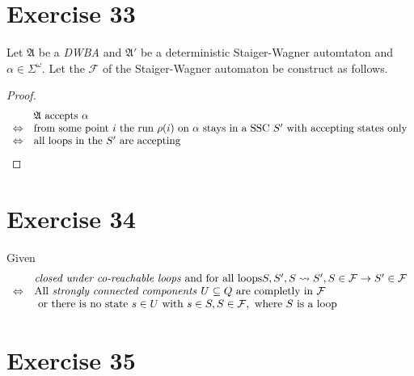 \documentclass[10pt]{article}
\begin{document}
  \section*{Exercise 33}
    Let $\mathfrak{A}$ be a \emph{DWBA} and $\mathfrak{A}\prime$ be a
    deterministic Staiger-Wagner automtaton and $\alpha\in \Sigma^{\omega}$.
    Let the $\mathcal{F}$ of the Staiger-Wagner automaton be construct as
    follows. 
    \begin{proof}
      \begin{displaymath}
        \begin{array}{r l}
           & \mathfrak{A} \text{ accepts } \alpha \\
          \Leftrightarrow & \text{from some point $i$ the run $\rho(i)$ on
                            $\alpha$ stays in a SSC $S^\prime$ with accepting 
                            states only} \\
          \Leftrightarrow & \text{all loops in the $S^\prime$ are accepting}
        \end{array}
      \end{displaymath}
    \end{proof}


  \section*{Exercise 34}
    Given
    \begin{displaymath}
      \begin{array}{ r l }
        & \text{\emph{closed under co-reachable loops} and for all loops} S,S^\prime,
        S\rightsquigarrow S^\prime,S\in \mathcal{F}\rightarrow S^\prime \in
        \mathcal{F} \\
        \Leftrightarrow & \text{All \emph{strongly connected components }}
        U\subseteq Q\text{ are completly in } \mathcal{F} \\
        & \text{ or there is no state } s\in U \text{ with } s\in S, S\in
        \mathcal{F}, \text{ where $S$ is a loop}
      \end{array}
    \end{displaymath}
    
  
  \section*{Exercise 35}
\end{document}
